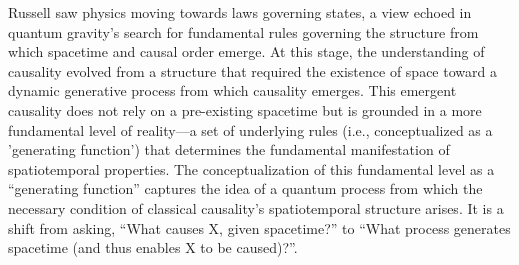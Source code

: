 Russell saw physics moving towards laws governing states, a view echoed in quantum gravity's search for fundamental rules governing the structure from which spacetime and causal order emerge. At this stage, the understanding of causality evolved from a structure that required the existence of space toward a dynamic generative process from which causality emerges. This emergent causality does not rely on a pre-existing spacetime but is grounded in a more fundamental level of reality—a set of underlying rules (i.e., conceptualized as a 'generating function') that determines the fundamental manifestation of spatiotemporal properties. The conceptualization of this fundamental level as a ``generating function'' captures the idea of a quantum process from which the necessary condition of classical causality's spatiotemporal structure arises. It is a shift from asking, ``What causes X, given spacetime?'' to ``What process generates spacetime (and thus enables X to be caused)?''.

\newpage
